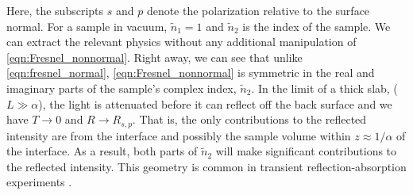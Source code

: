 Here, the subscripts $s$ and $p$ denote the polarization relative to the surface normal. For a sample in vacuum, $\tilde{n}_1=1$ and $\tilde{n}_2$ is the index of the sample. We can extract the relevant physics without any additional manipulation of \cref{eqn:Fresnel_nonnormal}. Right away, we can see that unlike \cref{eqn:fresnel_normal}, \cref{eqn:Fresnel_nonnormal} is symmetric in the real and imaginary parts of the sample's complex index, $\tilde{n}_2$. In the limit of a thick slab, ($L \gg \alpha$), the light is attenuated before it can reflect off the back surface and we have $T \rightarrow 0$ and $R \rightarrow R_{s,p}$. That is, the only contributions to the reflected intensity are from the interface and possibly the sample volume within $z \approx 1/\alpha$ of the interface. As a result, both parts of $\tilde{n}_2$ will make significant contributions to the reflected intensity. This geometry is common in transient reflection-absorption experiments \cite{cirriAchievingSurfaceSensitivity2017,kaplanFemtosecondTrackingCarrier2018}.



%
%
%
%
%
%
%
%
%
%
%
%


